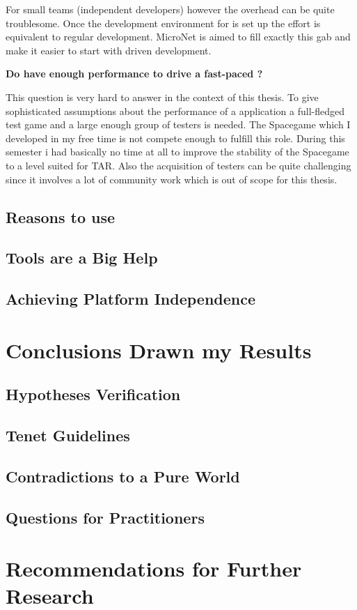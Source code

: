 For small teams (independent developers) however the overhead can be quite
troublesome. Once the development environment for \ms{}is set up the effort is
equivalent to regular \og{} development. MicroNet is aimed to fill exactly this
gab and make it easier to start with \ms{} driven \og{} development.

\noindent
\textbf{Do \mss{} have enough performance to drive a fast-paced \ogs{}?}

This question is very hard to answer in the context of this thesis. To give
sophisticated assumptions about the performance of a \ms{} application a  
full-fledged test game and a large enough group of testers is needed. The
Spacegame which I developed in my free time is not compete enough to fulfill
this role. During this semester i had basically no time at all to improve the
stability of the Spacegame to a level suited for TAR. Also the acquisition of
testers can be quite challenging since it involves a lot of community work
which is out of scope for this thesis.



\subsection{Reasons to use \mss{}}

\subsection{Tools are a Big Help}

\subsection{Achieving Platform Independence}

\section{Conclusions Drawn my Results}

\subsection{Hypotheses Verification}

\subsection{\ms{} Tenet Guidelines}

\subsection{Contradictions to a Pure \ms{} World}

\subsection{Questions for Practitioners}

\section{Recommendations for Further Research}